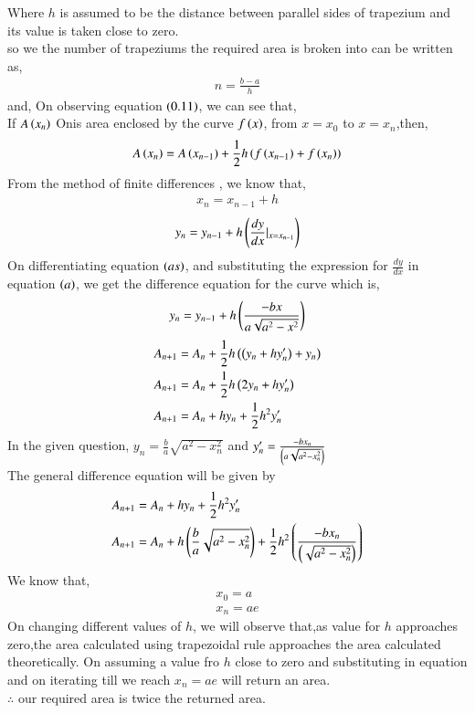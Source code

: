 \documentclass[journal]{IEEEtran}
\begin{document}
Where $h$ is assumed to be the distance between parallel sides of trapezium and its value is taken close to zero.\\
so we the number of trapeziums the required area is broken into can be written as,
\begin{align}
    n = \frac{b - a}{h}
\end{align}
and,
On observing equation $\left(0.11\right)$, we can see that,\\
If $A\left(x_n\right)$ Onis area enclosed by the curve $f\left(x\right)$, from $x=x_0$ to $x=x_n$,then,
\begin{align}
    A\left(x_n\right) = A\left(x_{n-1}\right) + \frac{1}{2}h\left(f\left(x_{n-1}\right) + f\left(x_n\right)\right)
\end{align}
From the method of finite differences , we know that,
\begin{align}
    x_n = x_{n-1} + h
\end{align}
\begin{align}
    y_{n} = y_{n-1} + h\left(\frac{dy}{dx}|_{x=x_{n-1}}\right)
\end{align}
On differentiating equation $\left(as\right)$, and substituting the expression for $\frac{dy}{dx}$ in equation $\left(a\right)$, we get the difference equation for the curve which is,
\begin{align}
     y_{n} = y_{n-1} + h\left(\frac{-bx}{a\sqrt{a^2 - x^2}}\right)
\end{align}
\begin{align}
  A_{n+1}&=A_n+\frac{1}{2}h\left(\left(y_{n}+hy^{\prime}_n\right)+y_n\right)\\
  A_{n+1}&=A_n+\frac{1}{2}h\left(2y_n+hy^{\prime}_n\right)\\
  A_{n+1}&=A_n+hy_n+\frac{1}{2}h^2y^{\prime}_n\\
\end{align}
In the given question, $y_n=\frac{b}{a}\sqrt{a^2-x_n^2}$ and $y^{\prime}_n= \frac{-bx_n}{\left(a\sqrt{a^2-x_n^2}\right)}$\\
The general difference equation will be given by
\begin{align}
  A_{n+1}&=A_n+hy_n+\frac{1}{2}h^2y^{\prime}_n\\
  A_{n+1}&=A_n+h\left(\frac{b}{a}\sqrt{a^2-x_n^2}\right)+\frac{1}{2}h^2\left(\frac{-bx_n}{\left(\sqrt{a^2-x_n^2}\right)}\right)\\
\end{align}
We know that,
\begin{align}
    x_0 = a\\
    x_n = ae
\end{align}
On changing different values of $h$, we will observe that,as value for $h$ approaches zero,the area calculated using trapezoidal rule approaches the area calculated theoretically.
On assuming a value fro $h$ close to zero and substituting in equation and on iterating till we reach $x_n=ae$ will return an area.\\
$\therefore$ our required area is twice the returned area.\\
\end{document}
